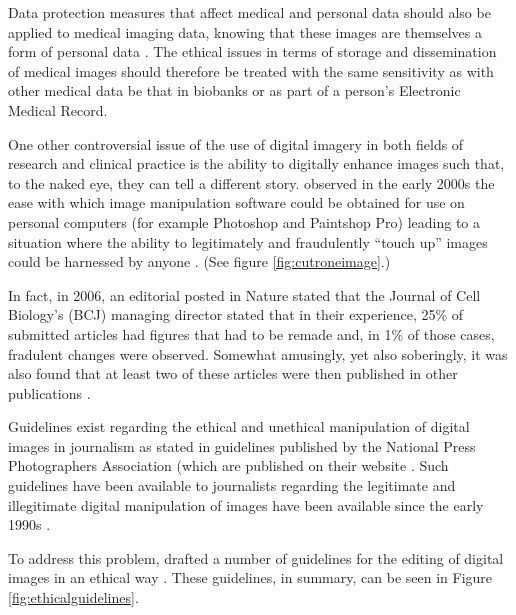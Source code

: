 \documentclass[british,a4paper, 12pt]{article}
\begin{document}
Data protection measures that affect medical and personal data should also be 
applied to medical imaging data, knowing that these images are themselves a form 
of personal data \parencite{duquenoy2008considering}. The ethical issues in terms of storage
and dissemination of medical images should therefore be treated with the same
sensitivity as with other medical data be that in biobanks or as part of a person's Electronic
Medical Record.

One other controversial issue of the use of digital imagery in both fields of research and 
clinical practice is the ability to digitally enhance images such that, to the naked eye, they 
can tell a different story. \citeauthor*{cutrone2001true} observed in the early 2000s the ease 
with which image manipulation software could be obtained for use on personal computers  (for example
Photoshop and Paintshop Pro) leading to a situation where the ability to legitimately and 
fraudulently ``touch up'' images could be harnessed by anyone \parencite{cutrone2001true}. (See
figure \ref{fig:cutroneimage}.)

In fact, in 2006, an editorial posted in Nature stated that the Journal of Cell Biology's (BCJ)
managing director stated that in their experience, 25\% of submitted articles had figures that
had to be remade and, in 1\% of those cases, fradulent changes were observed. Somewhat amusingly,
yet also soberingly, it was also found that at least two of these articles were then published
in other publications \parencite{cromey2009digital}.

Guidelines exist regarding the ethical and unethical manipulation of digital images in journalism as
stated in guidelines published by the National Press Photographers Association (which are
published on their website \parencite{national2012ethics}. Such guidelines have been available to
journalists regarding the legitimate and illegitimate digital manipulation of images have been
available since the early 1990s \parencite{cromey2010avoiding}.

To address this problem, \citeauthor*{cromey2001digital} drafted a number of guidelines for
the editing of digital images in an ethical way \parencite{cromey2001digital}. These guidelines,
in summary, can be seen in Figure \ref{fig:ethicalguidelines}.
\end{document}
